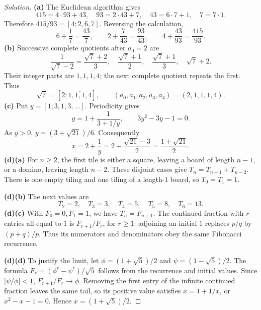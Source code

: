 \documentclass[12pt]{amsart}
\newenvironment{solution}
{\begin{proof}[Solution]}
{\end{proof}}
\begin{document}
\begin{onehalfspace}
        \begin{solution}
            \textbf{(a)} The Euclidean algorithm gives
            \[
                415=4\cdot93+43,\quad 93=2\cdot43+7,\quad
                43=6\cdot7+1,\quad 7=7\cdot1.
            \]
            Therefore $415/93=[4;2,6,7]$. Reversing the calculation,
            \[
                6+\frac17=\frac{43}{7},\qquad
                2+\frac{7}{43}=\frac{93}{43},\qquad
                4+\frac{43}{93}=\frac{415}{93}.
            \]
            \textbf{(b)} Successive complete quotients after $a_0=2$ are
            \[
                \frac{1}{\sqrt7-2}=\frac{\sqrt7+2}{3},\quad
                \frac{\sqrt7+1}{2},\quad
                \frac{\sqrt7+1}{3},\quad \sqrt7+2.
            \]
            Their integer parts are $1,1,1,4$; the next complete quotient
            repeats the first. Thus
            \[
                \sqrt7=[2;\overline{1,1,1,4}],\qquad
                (a_0,a_1,a_2,a_3,a_4)=(2,1,1,1,4).
            \]
            \textbf{(c)} Put $y=[1;3,1,3,\ldots]$. Periodicity gives
            \[
                y=1+\frac{1}{3+1/y},\qquad
                3y^2-3y-1=0.
            \]
            As $y>0$, $y=(3+\sqrt{21})/6$. Consequently
            \[
                x=2+\frac1y=2+\frac{\sqrt{21}-3}{2}
                =\boxed{\frac{1+\sqrt{21}}{2}}.
            \]
            \textbf{(d)(a)} For $n\ge2$, the first tile is either a square,
            leaving a board of length $n-1$, or a domino, leaving length
            $n-2$. These disjoint cases give $T_n=T_{n-1}+T_{n-2}$.
            There is one empty tiling and one tiling of a length-$1$ board,
            so $T_0=T_1=1$.

            \textbf{(d)(b)} The next values are
            \[
                T_2=2,\quad T_3=3,\quad T_4=5,\quad T_5=8,\quad T_6=13.
            \]
            \textbf{(d)(c)} With $F_0=0,F_1=1$, we have $T_n=F_{n+1}$.
            The continued fraction with $r$ entries all equal to $1$ is
            $F_{r+1}/F_r$, for $r\ge1$: adjoining an initial $1$ replaces
            $p/q$ by $(p+q)/p$. Thus its numerators and denominators
            obey the same Fibonacci recurrence.

            \textbf{(d)(d)} To justify the limit, let
            $\phi=(1+\sqrt5)/2$ and $\psi=(1-\sqrt5)/2$.
            The formula $F_r=(\phi^r-\psi^r)/\sqrt5$ follows from the
            recurrence and initial values. Since $|\psi/\phi|<1$,
            $F_{r+1}/F_r\to\phi$. Removing the first entry of the infinite
            continued fraction leaves the same tail, so its positive
            value satisfies $x=1+1/x$, or $x^2-x-1=0$.
            Hence $x=(1+\sqrt5)/2$.


\end{solution}
\end{onehalfspace}
\end{document}
